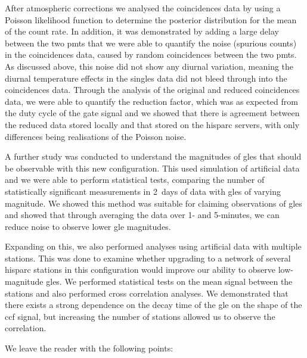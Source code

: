After atmospheric corrections we analysed the coincidences data by using a Poisson likelihood function to determine the posterior distribution for the mean of the count rate. In addition, it was demonstrated by adding a large delay between the two \glspl{pmt} that we were able to quantify the noise (spurious counts) in the coincidences data, caused by random coincidences between the two \glspl{pmt}. As discussed above, this noise did not show any diurnal variation, meaning the diurnal temperature effects in the singles data did not bleed through into the coincidences data. Through the analysis of the original and reduced coincidences data, we were able to quantify the reduction factor, which was as expected from the duty cycle of the gate signal and we showed that there is agreement between the reduced data stored locally and that stored on the \gls{hisparc} servers, with only differences being realisations of the Poisson noise.

A further study was conducted to understand the magnitudes of \glspl{gle} that should be observable with this new configuration. This used simulation of artificial data and we were able to perform statistical tests, comparing the number of statistically significant measurements in 2~days of data with \glspl{gle} of varying magnitude. We showed this method was suitable for claiming observations of \glspl{gle} and showed that through averaging the data over 1- and 5-minutes, we can reduce noise to observe lower \gls{gle} magnitudes.

Expanding on this, we also performed analyses using artificial data with multiple stations. This was done to examine whether upgrading to a network of several \gls{hisparc} stations in this configuration would improve our ability to observe low-magnitude \glspl{gle}. We performed statistical tests on the mean signal between the stations and also performed cross correlation analyses. We demonstrated that there exists a strong dependence on the decay time of the \gls{gle} on the shape of the \gls{ccf} signal, but increasing the number of stations allowed us to observe the correlation.


We leave the reader with the following points:


